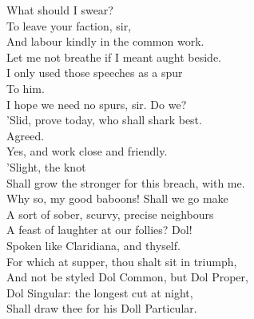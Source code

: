\documentclass[a4paper,oneside,12pt]{memoir}
\begin{document}
\begin{drama*}
\subtlespeaks What should I swear?\\
\dolspeaks {} To leave your faction, sir,\\
And labour kindly in the common work.\\
\subtlespeaks Let me not breathe if I meant aught beside.\\
I only used those speeches as a spur\\
To him.\\
\dolspeaks {} I hope we need no spurs, sir. Do we?\\
\facespeaks 'Slid, prove today, who shall shark best.\\
\subtlespeaks {} Agreed.\\
\dolspeaks Yes, and work close and friendly.\\
\subtlespeaks {} 'Slight, the knot\\
Shall grow the stronger for this breach, with me.\\
\dolspeaks Why so, my good baboons! Shall we go make\\
A sort of sober, scurvy, precise neighbours\\
A feast of laughter at our follies?
\subtlespeaks {} Dol!\\
Spoken like Claridiana, and thyself.\\
\facespeaks For which at supper, thou shalt sit in triumph,\\
And not be styled Dol Common, but Dol Proper,\\
Dol Singular: the longest cut at night,\\
Shall draw thee for his Doll Particular.\\

\scene


\end{drama*}
\end{document}
